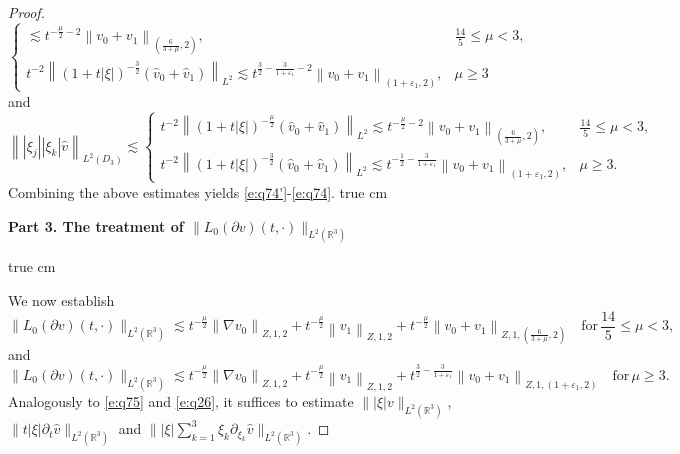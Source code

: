 \documentclass[11pt,twoside]{article}
\newcommand{\R}{\mathbb R}
\newcommand{\p}{\partial}
\newcommand{\f}{\frac}
\newcommand{\ds}{\displaystyle}
\theoremstyle{plain}
\theoremstyle{definition}
\theoremstyle{remark}
\numberwithin{equation}{section}
\begin{document}
\begin{proof}
$$\begin{cases}
\lesssim t^{-\f{\mu}{2}-2}\left\|v_0+v_1\right\|_{(\f{6}{3+\mu},2)},& \f{14}{5}\leq\mu<3,\\ t^{-2}\left\|(1+t|\xi|)^{-\f32}(\hat{v}_{0}+\hat{v}_{1})\right\|_{L^{2}} \lesssim t^{\f32-\f{3}{1+\varepsilon_1}-2}\left\|v_0+v_1\right\|_{(1+\varepsilon_1,2)},& \mu\geq3
\end{cases}
$$
and
$$
\left\||\xi_j||\xi_k|\hat{v}\right\|_{L^2(D_3)}\lesssim\begin{cases} t^{-2}\left\|(1+t|\xi|)^{-\f{\mu}{2}}(\hat{v}_{0}+\hat{v}_{1})\right\|_{L^{2}} \lesssim t^{-\f{\mu}{2}-2}\left\|v_0+v_1\right\|_{(\f{6}{3+\mu},2)},& \f{14}{5}\leq\mu<3,\\ t^{-2}\left\|(1+t|\xi|)^{-\f32}(\hat{v}_{0}+\hat{v}_{1})\right\|_{L^{2}} \lesssim t^{-\f12-\f{3}{1+\varepsilon_1}}\left\|v_0+v_1\right\|_{(1+\varepsilon_1,2)},& \mu\geq3.
\end{cases}
$$
Combining the above estimates yields \eqref{e:q74'}-\eqref{e:q74}.
 true cm

{\bf Part 3.  The treatment of $\|L_0(\p v)(t, \cdot)\|_{L^2(\R^3)}$}

 true cm

We now establish
\begin{equation}\label{e:q79'}
\|L_0(\p v)(t, \cdot)\|_{L^2(\R^3)}  \lesssim t^{-\f{\mu}{2}}\left\|\nabla v_0\right\|_{Z, 1, 2}+t^{-\f{\mu}{2}}\left\| v_1\right\|_{Z, 1, 2}+t^{-\f{\mu}{2}}\left\|v_0+v_1\right\|_{Z, 1,(\f{6}{3+\mu},2)} \quad \text{for}\, \f{14}{5}\leq\mu<3,
\end{equation}
and
\begin{equation}\label{e:q79}
\|L_0(\p v)(t, \cdot)\|_{L^2(\R^3)} \lesssim t^{-\f{\mu}{2}}\left\|\nabla v_0\right\|_{Z, 1, 2}+t^{-\f{\mu}{2}}\left\| v_1\right\|_{Z, 1, 2}+t^{\f32-\f{3}{1+\varepsilon_1}}\left\|v_0+v_1\right\|_{Z, 1,(1+\varepsilon_1,2)}\quad \text{for}\, \mu\geq3.
\end{equation}
Analogously to \eqref{e:q75} and \eqref{e:q26}, it suffices to estimate $\||\xi|v\|_{L^2(\R^3)}$, $\|t|\xi|\p_t\hat{v}\|_{L^2(\R^3)}$ and $\||\xi|\ds\sum_{k=1}^3\xi_k\p_{\xi_k}\hat{v}\|_{L^2(\R^3)}$.


\end{proof}
\end{document}
